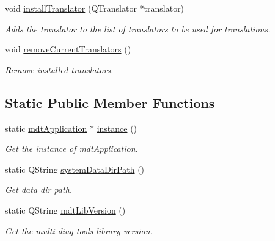 \begin{DoxyCompactItemize}
void \hyperlink{classmdt_application_af4ff7f4cbb1c93a35f06ea197e3dde42}{installTranslator} (QTranslator $\ast$translator)
\begin{DoxyCompactList}\small\item\em Adds the translator to the list of translators to be used for translations. \end{DoxyCompactList}\item 
void \hyperlink{classmdt_application_ae83acc410a132b9972d6e961e0c79b0d}{removeCurrentTranslators} ()
\begin{DoxyCompactList}\small\item\em Remove installed translators. \end{DoxyCompactList}\end{DoxyCompactItemize}
\subsection*{Static Public Member Functions}
\begin{DoxyCompactItemize}
\item 
static \hyperlink{classmdt_application}{mdtApplication} $\ast$ \hyperlink{classmdt_application_a365ac79934070b0e5a42d2c7cd9b076d}{instance} ()
\begin{DoxyCompactList}\small\item\em Get the instance of \hyperlink{classmdt_application}{mdtApplication}. \end{DoxyCompactList}\item 
\hypertarget{classmdt_application_af17bb16e420c91af3d0ad1970714388c}{
static QString \hyperlink{classmdt_application_af17bb16e420c91af3d0ad1970714388c}{systemDataDirPath} ()}
\label{classmdt_application_af17bb16e420c91af3d0ad1970714388c}

\begin{DoxyCompactList}\small\item\em Get data dir path. \end{DoxyCompactList}\item 
\hypertarget{classmdt_application_ad5318086812dad2c2870e294703caa51}{
static QString \hyperlink{classmdt_application_ad5318086812dad2c2870e294703caa51}{mdtLibVersion} ()}
\label{classmdt_application_ad5318086812dad2c2870e294703caa51}

\begin{DoxyCompactList}\small\item\em Get the multi diag tools library version. \end{DoxyCompactList}\end{DoxyCompactItemize}


